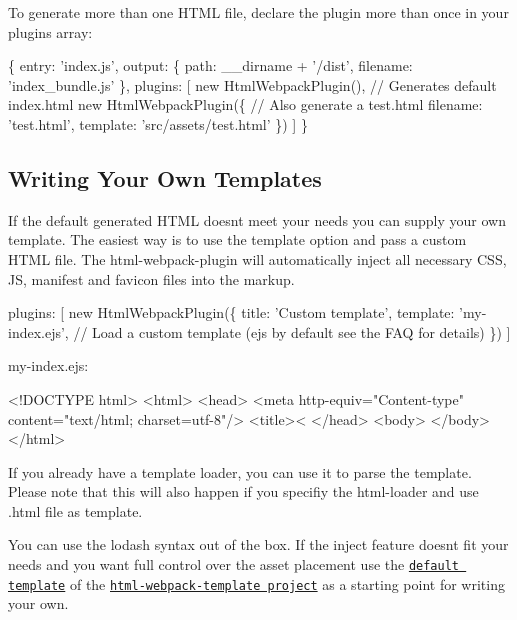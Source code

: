 To generate more than one H\+T\+ML file, declare the plugin more than once in your plugins array\+: 
\begin{DoxyCode}
\{
  entry: 'index.js',
  output: \{
    path: \_\_dirname + '/dist',
    filename: 'index\_bundle.js'
  \},
  plugins: [
    new HtmlWebpackPlugin(), // Generates default index.html
    new HtmlWebpackPlugin(\{  // Also generate a test.html
      filename: 'test.html',
      template: 'src/assets/test.html'
    \})
  ]
\}
\end{DoxyCode}


\subsection*{Writing Your Own Templates }

If the default generated H\+T\+ML doesn\textquotesingle{}t meet your needs you can supply your own template. The easiest way is to use the {\ttfamily template} option and pass a custom H\+T\+ML file. The html-\/webpack-\/plugin will automatically inject all necessary C\+SS, JS, manifest and favicon files into the markup.


\begin{DoxyCode}
plugins: [
  new HtmlWebpackPlugin(\{
    title: 'Custom template',
    template: 'my-index.ejs', // Load a custom template (ejs by default see the FAQ for details)
  \})
]
\end{DoxyCode}


{\ttfamily my-\/index.\+ejs}\+:


\begin{DoxyCode}
<!DOCTYPE html>
<html>
  <head>
    <meta http-equiv="Content-type" content="text/html; charset=utf-8"/>
    <title><%
  </head>
  <body>
  </body>
</html>
\end{DoxyCode}


If you already have a template loader, you can use it to parse the template. Please note that this will also happen if you specifiy the html-\/loader and use {\ttfamily .html} file as template.




You can use the lodash syntax out of the box. If the {\ttfamily inject} feature doesn\textquotesingle{}t fit your needs and you want full control over the asset placement use the \href{https://github.com/jaketrent/html-webpack-template/blob/86f285d5c790a6c15263f5cc50fd666d51f974fd/index.html}{\tt default template} of the \href{https://github.com/jaketrent/html-webpack-template}{\tt html-\/webpack-\/template project} as a starting point for writing your own.

